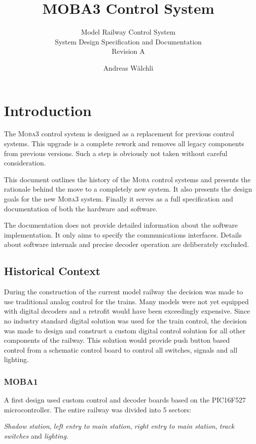 \documentclass{scrreprt}
\title{MOBA3 Control System}
\subtitle{Model Railway Control System\\System Design Specification and Documentation\\Revision A}
\author{Andreas Wälchli}
\begin{document}
\maketitle

\tableofcontents

\chapter{Introduction}
The \textsc{Moba3} control system is designed as a replacement for previous control systems.
This upgrade is a complete rework and removes all legacy components from previous versions.
Such a step is obviously not taken without careful consideration.

This document outlines the history of the \textsc{Moba} control systems and presents the rationale behind the move to a completely new system.
It also presents the design goals for the new \textsc{Moba3} system.
Finally it serves as a full specification and documentation of both the hardware and software.

The documentation does not provide detailed information about the software implementation.
It only aims to specify the communications interfaces.
Details about software internals and precise decoder operation are deliberately excluded.

\section{Historical Context}
During the construction of the current model railway the decision was made to use traditional analog control for the trains.
Many models were not yet equipped with digital decoders and a retrofit would have been exceedingly expensive.
Since no industry standard digital solution was used for the train control, the decision was made to design and construct a custom digital control solution for all other components of the railway.
This solution would provide push button based control from a schematic control board to control all switches, signals and all lighting.

\subsection{MOBA1}
A first design used custom control and decoder boards based on the PIC16F527 microcontroller.
The entire railway was divided into 5 sectors:

\emph{Shadow station}, \emph{left entry to main station}, \emph{right entry to main station}, \emph{track switches} and \emph{lighting}.
\end{document}
